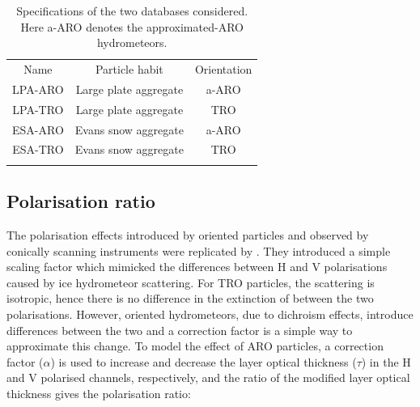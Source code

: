 \documentclass[amt, manuscript]{copernicus}
\begin{document}


 
\begin{table}[t]
	\caption{Specifications of the two databases considered. Here a-ARO denotes the approximated-ARO hydrometeors.}
	\label{tab:database_configuration}	
	\begin{tabular}{ccc}
		\tophline
		Name & Particle habit 	& Orientation  \\
		\middlehline
		LPA-ARO & Large plate aggregate & a-ARO\\
		LPA-TRO & Large plate aggregate & TRO\\
		ESA-ARO & Evans snow aggregate  & a-ARO\\
		ESA-TRO & Evans snow aggregate & TRO\\
		\bottomhline
	\end{tabular}
	\belowtable{} %
\end{table}



\subsection{Polarisation ratio}
\label{sec:polratio}

The polarisation effects introduced by oriented particles and observed by conically scanning instruments \citep{gong:micro:17} were replicated by \citet{barlakas:intro:21}. They introduced a simple scaling factor which mimicked the differences between H and V polarisations caused by ice hydrometeor scattering. For TRO particles, the scattering is isotropic, hence there is no difference in the extinction of between the two polarisations. However, oriented hydrometeors, due to dichroism effects, introduce differences between the two and a correction factor is a simple way to approximate this change. To model the effect of ARO particles, a correction factor ($\alpha$) is used to increase and decrease the layer optical thickness ($\tau$) in the H and V
polarised channels, respectively, and the ratio of the modified layer optical thickness gives the polarisation ratio:
\end{document}
